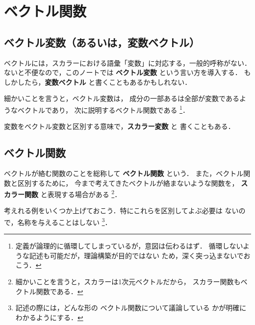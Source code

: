 ﻿%
 \section{ベクトル関数}
    \subsection{ベクトル変数（あるいは，変数ベクトル）}
    ベクトルには，スカラーにおける語彙「変数」に対応する，一般的呼称がない．
    ないと不便なので，このノートでは \textbf{ベクトル変数} という言い方を導入する．
    もしかしたら，\textbf{変数ベクトル} と書くこともあるかもしれない．

    細かいことを言うと，ベクトル変数は，
    成分の一部あるは全部が変数であるようなベクトルであり，
    次に説明するベクトル関数である
        \footnote{
            定義が論理的に循環してしまっているが，意図は伝わるはず．
            循環しないような記述も可能だが，理論構築が目的ではない
            ため，深く突っ込まないでおこう．
        }．

    変数をベクトル変数と区別する意味で，\textbf{スカラー変数} と
    書くこともある．

    \subsection{ベクトル関数}
    ベクトルが絡む関数のことを総称して \textbf{ベクトル関数} という．
    また，ベクトル関数と区別するために，
    今まで考えてきたベクトルが絡まないような関数を，
    \textbf{スカラー関数} と表現する場合がある
        \footnote{
            細かいことを言うと，スカラーは1次元ベクトルだから，
            スカラー関数もベクトル関数である．
        }．

    考えれる例をいくつか上げておこう．特にこれらを区別してよぶ必要は
    ないので，名称を与えることはしない
        \footnote{
            記述の際には，どんな形の
            ベクトル関数について議論している
            かが明確にわかるようにする．
        }．

